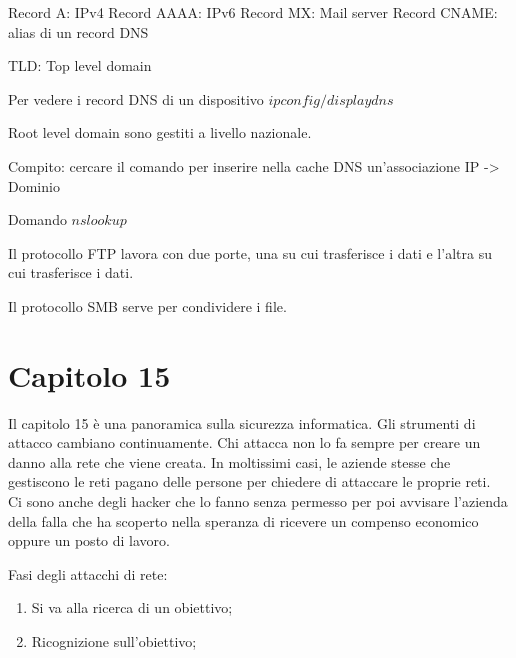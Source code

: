 \documentclass{article}
\begin{document}
    Record A: IPv4
    Record AAAA: IPv6
    Record MX: Mail server
    Record CNAME: alias di un record DNS

    TLD: Top level domain

    Per vedere i record DNS di un dispositivo $ipconfig /displaydns$

    Root level domain sono gestiti a livello nazionale.

    Compito: cercare il comando per inserire nella cache DNS un'associazione IP -> Dominio

    Domando $nslookup$

    Il protocollo FTP lavora con due porte, una su cui trasferisce i dati e l'altra su cui trasferisce i dati.

    Il protocollo SMB serve per condividere i file.

    \section{Capitolo 15}
    Il capitolo 15 è una panoramica sulla sicurezza informatica. Gli strumenti di attacco cambiano continuamente. Chi attacca non lo fa sempre per creare un danno alla rete che viene creata. In moltissimi casi, le aziende stesse che gestiscono le reti pagano delle persone per chiedere di attaccare le proprie reti.\\
    Ci sono anche degli hacker che lo fanno senza permesso per poi avvisare l'azienda della falla che ha scoperto nella speranza di ricevere un compenso economico oppure un posto di lavoro.

    Fasi degli attacchi di rete:

    \begin{enumerate}
        \item Si va alla ricerca di un obiettivo;
        \item Ricognizione sull'obiettivo;
    \end{enumerate}
\end{document}
